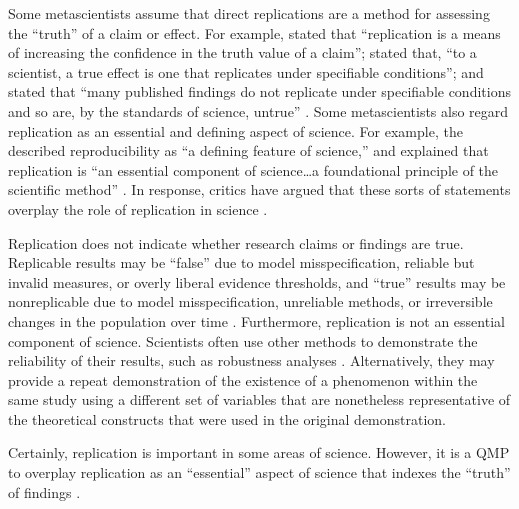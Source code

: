 \documentclass[authordate, meta, issue]{jote-new-article}
\begin{document}
Some metascientists assume that direct replications are a method for assessing the “truth” of a claim or effect. For example, \textcite[p. 617]{Nosek2012} stated that “replication is a means of increasing the confidence in the truth value of a claim”; \textcite[p. 520]{Nelson2018} stated that, “to a scientist, a true effect is one that replicates under specifiable conditions”; and \textcite[p. 153]{Simmons2021} stated that “many published findings do not replicate under specifiable conditions and so are, by the standards of science, untrue” \parencites[for further examples, see][pp. 6-8]{Devezer2021}. Some metascientists also regard replication as an essential\emph{ }and\emph{ }defining aspect of science. For example, the \textcite[p. 1]{Collaboration2015} described reproducibility as “a defining feature of science,” and \textcite[p. 13]{Zwaan2018} explained that replication is “an essential component of science…a foundational principle of the scientific method” \parencites[see also][p. 108]{Asendorpf2013}[p. 48]{Chambers2017}[p. 618]{Nosek2012}[for further examples, see][p. 64]{Drummond2019}[p. 226]{Haig2022}[p. 487]{Maxwell2015}. In response, critics have argued that these sorts of statements overplay the role of replication in science \parencites{Boeck2018}{Devezer2019}{Devezer2021}{Feest2019}{Greenfield2017}{Guttinger2020}{Haig2022}{Iso-Ahola2020}{Leonelli2018}{Norton2015}.



Replication does not indicate whether research claims or findings are true. Replicable results may be “false” due to model misspecification, reliable but invalid measures, or overly liberal evidence thresholds, and “true” results may be nonreplicable due to model misspecification, unreliable methods, or irreversible changes in the population over time \parencites{Bak-Coleman2022}{Buzbas2023}{Boeck2018}{Devezer2019}{Devezer2021}{Errington2021b}{Guttinger2020}{Iso-Ahola2020}{Norton2015}[p. 739]{Nosek2022}{Rubin2021a}{Stanley2014}. Furthermore, replication is not an essential component of science. Scientists often use other methods to demonstrate the reliability of their results, such as robustness analyses \parencites{Haig2022}{Leonelli2018}. Alternatively, they may provide a repeat demonstration of the existence of a phenomenon within the same study using a different set of variables that are nonetheless representative of the theoretical constructs that were used in the original demonstration.



Certainly, replication is important in some areas of science. However, it is a QMP to overplay replication as an “essential” aspect of science that indexes the “truth” of findings \parencites[p. 10]{Devezer2021}.
\end{document}
